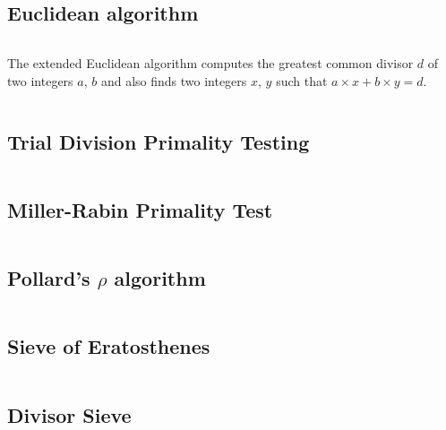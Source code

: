 \documentclass[9pt,a4paper,twocolumn,landscape,oneside]{amsart}
\newcommand{\code}[1]{\inputminted{cpp}{_code/#1}}
\newif\ifverbose
\begin{document}
    \subsection{Euclidean algorithm}
        \ifverbose
        The Euclidean algorithm computes the greatest common divisor of two
        integers $a$, $b$.
        \fi
        \code{mathematics/gcd.cpp}

        The extended Euclidean algorithm computes the greatest common divisor
        $d$ of two integers $a$, $b$ and also finds two integers $x$, $y$ such
        that $a\times x + b\times y = d$.
        \code{mathematics/egcd.cpp}

    \subsection{Trial Division Primality Testing}
        \ifverbose
        An optimized trial division to check whether an integer is prime.
        \fi
        \code{mathematics/is_prime.cpp}

    \subsection{Miller-Rabin Primality Test}
        \ifverbose
        The Miller-Rabin probabilistic primality test.
        \fi
        \code{mathematics/miller_rabin.cpp}

    \subsection{Pollard's $\rho$ algorithm}
        \code{mathematics/pollard_rho.cpp}

    \subsection{Sieve of Eratosthenes}
        \ifverbose
        An optimized implementation of Eratosthenes' Sieve.
        \fi
        \code{mathematics/prime_sieve.cpp}

    \subsection{Divisor Sieve}
        \ifverbose
        A O(n) prime sieve. Computes the smallest divisor of any number up to n.
        \fi
        \code{mathematics/divisor_sieve.cpp}

    \ifverbose
    \subsection{Modular Exponentiation}
        A function to perform fast modular exponentiation.
        \code{mathematics/mod_pow.cpp}
    \fi
\end{document}
